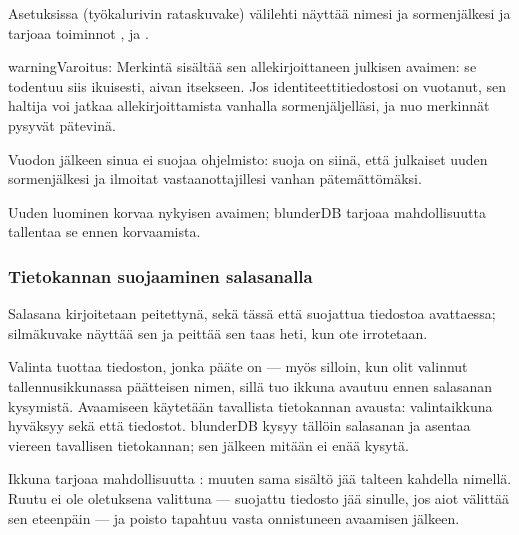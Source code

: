 \documentclass[letterpaper,10pt,finnish]{sphinxmanual}
\begin{document}
\sphinxAtStartPar
Asetuksissa (työkalurivin rataskuvake)  \sphinxhyphen{}välilehti näyttää nimesi ja sormenjälkesi ja tarjoaa toiminnot ,  ja .

\begin{sphinxadmonition}{warning}{Varoitus:}
\sphinxAtStartPar
{} Merkintä sisältää sen allekirjoittaneen julkisen avaimen: se todentuu siis ikuisesti, aivan itsekseen. Jos identiteettitiedostosi on vuotanut, sen haltija voi jatkaa allekirjoittamista vanhalla sormenjäljelläsi, ja nuo merkinnät pysyvät pätevinä.

\sphinxAtStartPar
Vuodon jälkeen sinua ei suojaa ohjelmisto: suoja on siinä, että julkaiset uuden sormenjälkesi ja ilmoitat vastaanottajillesi vanhan pätemättömäksi.

\sphinxAtStartPar
Uuden luominen korvaa nykyisen avaimen; blunderDB tarjoaa mahdollisuutta tallentaa se ennen korvaamista.
\end{sphinxadmonition}


\subsubsection{Tietokannan suojaaminen salasanalla}
\label{\detokenize{manuel:proteger-une-base-par-un-mot-de-passe}}
\sphinxAtStartPar
Salasana kirjoitetaan peitettynä, sekä tässä että suojattua tiedostoa avattaessa; silmäkuvake näyttää sen  ja peittää sen taas heti, kun ote irrotetaan.

\sphinxAtStartPar
Valinta  tuottaa tiedoston, jonka pääte on  — myös silloin, kun olit valinnut tallennusikkunassa \sphinxhyphen{}päätteisen nimen, sillä tuo ikkuna avautuu ennen salasanan kysymistä. Avaamiseen käytetään tavallista tietokannan avausta: valintaikkuna hyväksyy sekä \sphinxhyphen{} että \sphinxhyphen{}tiedostot. blunderDB kysyy tällöin salasanan ja asentaa viereen tavallisen tietokannan; sen jälkeen mitään ei enää kysytä.

\sphinxAtStartPar
Ikkuna tarjoaa mahdollisuutta : muuten sama sisältö jää talteen kahdella nimellä. Ruutu ei ole oletuksena valittuna — suojattu tiedosto jää sinulle, jos aiot välittää sen eteenpäin — ja poisto tapahtuu vasta onnistuneen avaamisen jälkeen.
\end{document}
